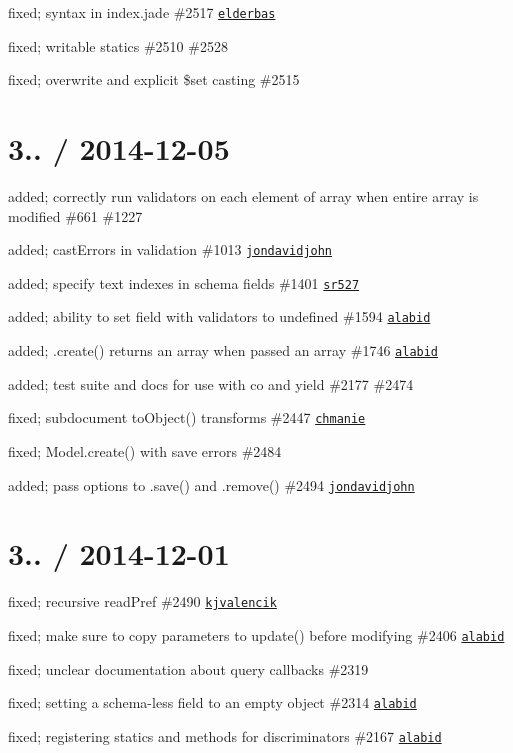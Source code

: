\begin{DoxyItemize}
\item fixed; syntax in index.\+jade \#2517 \href{https://github.com/elderbas}{\tt elderbas}
\item fixed; writable statics \#2510 \#2528
\item fixed; overwrite and explicit \$set casting \#2515
\end{DoxyItemize}

\section*{3.. / 2014-\/12-\/05 }


\begin{DoxyItemize}
\item added; correctly run validators on each element of array when entire array is modified \#661 \#1227
\item added; cast\+Errors in validation \#1013 \href{https://github.com/jondavidjohn}{\tt jondavidjohn}
\item added; specify text indexes in schema fields \#1401 \href{https://github.com/sr527}{\tt sr527}
\item added; ability to set field with validators to undefined \#1594 \href{https://github.com/alabid}{\tt alabid}
\item added; .create() returns an array when passed an array \#1746 \href{https://github.com/alabid}{\tt alabid}
\item added; test suite and docs for use with co and yield \#2177 \#2474
\item fixed; subdocument to\+Object() transforms \#2447 \href{https://github.com/chmanie}{\tt chmanie}
\item fixed; Model.\+create() with save errors \#2484
\item added; pass options to .save() and .remove() \#2494 \href{https://github.com/jondavidjohn}{\tt jondavidjohn}
\end{DoxyItemize}

\section*{3.. / 2014-\/12-\/01 }


\begin{DoxyItemize}
\item fixed; recursive read\+Pref \#2490 \href{https://github.com/kjvalencik}{\tt kjvalencik}
\item fixed; make sure to copy parameters to update() before modifying \#2406 \href{https://github.com/alabid}{\tt alabid}
\item fixed; unclear documentation about query callbacks \#2319
\item fixed; setting a schema-\/less field to an empty object \#2314 \href{https://github.com/alabid}{\tt alabid}
\item fixed; registering statics and methods for discriminators \#2167 \href{https://github.com/alabid}{\tt alabid}
\end{DoxyItemize}

